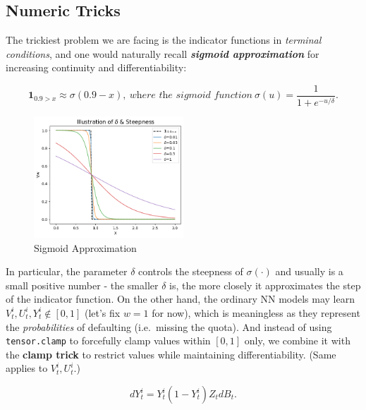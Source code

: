 \documentclass[a4paper,10pt]{article}
\newcommand{\1}{\mathbf{1}}
\begin{document}
\subsection{Numeric Tricks}\label{numeric-tricks}

The trickiest problem we are facing is the indicator functions in
\emph{terminal conditions}, and one would naturally recall
\textbf\textit{sigmoid approximation} for increasing continuity and
differentiability:

\begin{equation}
    \1_{0.9>x} \approx \sigma(0.9-x), ~\textit{where the sigmoid function}~\sigma(u)=\frac{1}{1+e^{-u/\delta}}.
\end{equation}

\begin{figure}[h]
    \centering
    \includegraphics[width=0.5\textwidth]{FinalReports/Illustration_diagrams/SigmoidApprox.png}
    \caption{Sigmoid Approximation}
    \label{fig:sig-approx}
\end{figure}

In particular, the parameter \(\delta\) controls the steepness of
\(\sigma(\cdot)\) and usually is a small positive number - the smaller
\(\delta\) is, the more closely it approximates the step of the indicator
function. On the other hand, the ordinary NN models may learn
\(V_t^i,U_t^i,Y_t^i \notin [0,1]\) (let's fix \(w=1\) for now), which is
meaningless as they represent the \emph{probabilities} of defaulting
(i.e.~missing the quota). And instead of using \texttt{tensor.clamp} to
forcefully clamp values within \([0,1]\) only, we combine it with the
\textbf{clamp trick} to restrict values while maintaining
differentiability. (Same applies to \(V_t^i, U_t^i\).)

\begin{equation}\label{dY_tilde}
    dY_t^i=Y_t^i(1-Y_t^i)Z_tdB_t.
\end{equation}
\end{document}
